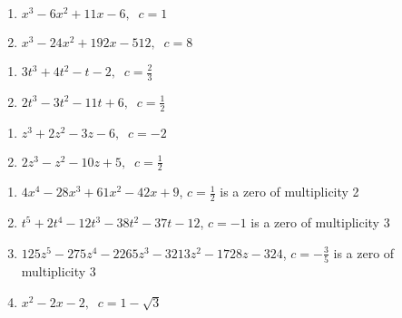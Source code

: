 \documentclass{ximera}
\begin{document}
\begin{multicols}{2}
\begin{enumerate}
\setcounter{enumi}{\value{HW}}

\item $x^{3} - 6x^{2} + 11x - 6, \;\; c = 1$ \label{factorpolyzerofirst}
\item $x^{3} - 24x^{2} + 192x - 512, \;\; c = 8$

\setcounter{HW}{\value{enumi}}
\end{enumerate}
\end{multicols}

\begin{multicols}{2}
\begin{enumerate}
\setcounter{enumi}{\value{HW}}

\item $3t^{3} + 4t^{2} - t - 2, \;\; c = \frac{2}{3}$
\item $2t^3-3t^2-11t+6, \;\; c=\frac{1}{2}$

\setcounter{HW}{\value{enumi}}
\end{enumerate}
\end{multicols}

\begin{multicols}{2}
\begin{enumerate}
\setcounter{enumi}{\value{HW}}

\item $z^3+2z^2-3z-6, \;\; c = -2$
\item $2z^3-z^2-10z+5, \;\; c=\frac{1}{2}$

\setcounter{HW}{\value{enumi}}
\end{enumerate}
\end{multicols}

\vspace*{-0.2in}
\enlargethispage{0.2in}
\begin{enumerate}
\setcounter{enumi}{\value{HW}}

\item $4x^{4} - 28x^{3} + 61x^{2} - 42x + 9$, $c = \frac{1}{2}$ is a zero of multiplicity 2 

\item  $t^5+2t^4-12t^3-38t^2-37t-12$, $c=-1$ is a zero of multiplicity 3

\item $125z^{5} - 275z^{4} - 2265z^{3} - 3213z^{2} - 1728z - 324$, $c = -\frac{3}{5}$ is a zero of multiplicity 3

\item $x^{2} - 2x - 2, \;\; c = 1 - \sqrt{3}$ \label{factorpolyzerolast}

\setcounter{HW}{\value{enumi}}
\end{enumerate}
\end{document}
